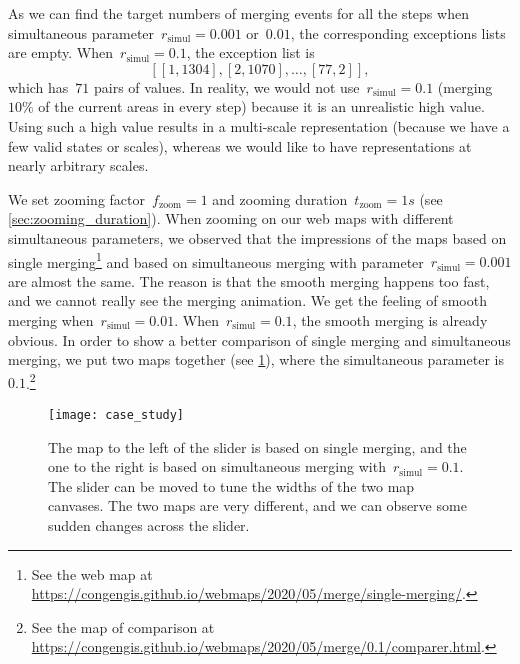 \documentclass[twocolumn]{svjour3}          %
\begin{document}
As we can find the target numbers of merging events for all the steps
when simultaneous parameter~$r_\mathrm{simul}= 0.001$ or~$0.01$, 
the corresponding exceptions lists are empty.
When~$r_\mathrm{simul}= 0.1$,
the exception list is
$$[[1, 1304], [2, 1070], \dots, [77, 2]],$$
which has~$71$ pairs of values.
In reality, we would not use~$r_\mathrm{simul}= 0.1$
(merging~$10\%$ of the current areas in every step)
because it is an unrealistic high value.
Using such a high value results in a multi-scale representation
(because we have a few valid states or scales),
whereas we would like to have representations at nearly
arbitrary scales.




We set zooming factor~$f_\mathrm{zoom}=1$ and 
zooming duration~$t_\mathrm{zoom}=1 s$ 
(see \sect\ref{sec:zooming_duration}).
When zooming on our web maps with different simultaneous parameters,
we observed that the impressions of the maps 
based on single merging\footnote{%
See the web map at
\url{https://congengis.github.io/webmaps/2020/05/merge/single-merging/}.} 
and based on simultaneous merging with parameter~$r_\mathrm{simul}= 0.001$ 
are almost the same.
The reason is that the smooth merging happens too fast,
and we cannot really see the merging animation.
We get the feeling of smooth merging when~$r_\mathrm{simul}= 0.01$.
When~$r_\mathrm{simul}= 0.1$, the smooth merging is already obvious.
In order to show a better comparison of single merging 
and simultaneous merging,
we put two maps together (see \fig\ref{fig:comparison}),
where the simultaneous parameter is~$0.1$.\footnote{%
See the map of comparison at
\url{https://congengis.github.io/webmaps/2020/05/merge/0.1/comparer.html}.}  


\begin{figure}[tb]
\centering
\texttt{[image: case\_study]}
\caption{
    The map to the left of the slider is based on single merging,
    and the one to the right is based on simultaneous merging
    with~$r_\mathrm{simul}= 0.1$.
    The slider can be moved to tune the widths of the two map canvases.
    The two maps are very different, and 
    we can observe some sudden changes across the slider.
}
\label{fig:comparison}
\end{figure}
\end{document}
